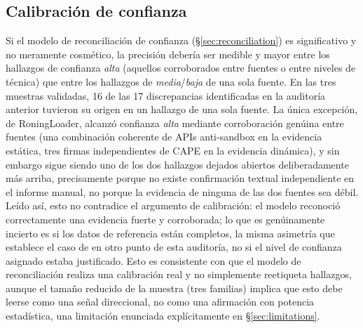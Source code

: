 \subsection{Calibraci\'on de confianza}
\label{sec:confidence-calibration}

Si el modelo de reconciliaci\'on de confianza (\S\ref{sec:reconciliation})
es significativo y no meramente cosm\'etico, la precisi\'on deber\'ia
ser medible y mayor entre los hallazgos de confianza \emph{alta}
(aquellos corroborados entre fuentes o entre niveles de t\'ecnica) que
entre los hallazgos de \emph{media}/\emph{baja} de una sola fuente. En
las tres muestras validadas, 16 de las 17 discrepancias identificadas en
la auditor\'ia anterior tuvieron su origen en un hallazgo de una sola
fuente. La \'unica excepci\'on,  de RoningLoader,
alcanz\'o confianza \emph{alta} mediante corroboraci\'on gen\'uina entre
fuentes (una combinaci\'on coherente de APIs anti-sandbox en la
evidencia est\'atica, tres firmas independientes de CAPE en la evidencia
din\'amica), y sin embargo sigue siendo uno de los dos hallazgos
dejados abiertos deliberadamente m\'as arriba, precisamente porque no
existe confirmaci\'on textual independiente en el informe manual, no
porque la evidencia de ninguna de las dos fuentes sea d\'ebil. Le\'ido
as\'i, esto no contradice el argumento de calibraci\'on: el modelo
reconoci\'o correctamente una evidencia fuerte y corroborada; lo que es
gen\'uinamente incierto es si los datos de referencia est\'an completos,
la misma asimetr\'ia que establece el caso de  en otro
punto de esta auditor\'ia, no si el nivel de confianza asignado estaba
justificado. Esto es consistente con que el modelo de
reconciliaci\'on realiza una calibraci\'on real y no simplemente
reetiqueta hallazgos, aunque el tama\~no reducido de la muestra (tres
familias) implica que esto debe leerse como una se\~nal direccional, no
como una afirmaci\'on con potencia estad\'istica, una limitaci\'on
enunciada expl\'icitamente en \S\ref{sec:limitations}.
